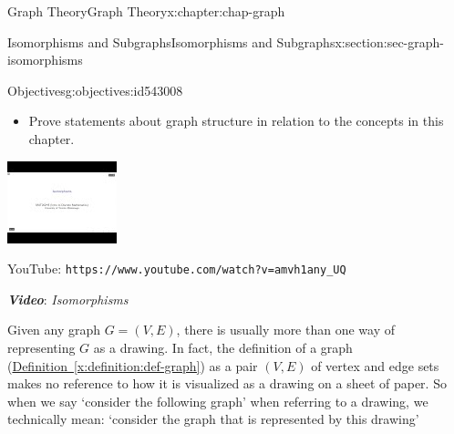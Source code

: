 \documentclass[oneside,10pt,]{book}
\newcommand{\xreffont}{\relax}
\newcommand{\mono}[1]{\texttt{#1}}
\newcommand{\alert}[1]{\textbf{\textit{#1}}}
\numberwithin{equation}{section}
\newlength{\qrsize}
\newlength{\previewwidth}
\begin{document}
\begin{chapterptx}{Graph Theory}{}{Graph Theory}{}{}{x:chapter:chap-graph}
\begin{sectionptx}{Isomorphisms and Subgraphs}{}{Isomorphisms and Subgraphs}{}{}{x:section:sec-graph-isomorphisms}
\begin{objectives}{Objectives}{g:objectives:id543008}
\begin{itemize}[label=\textbullet]
\item{}Prove statements about graph structure in relation to the concepts in this chapter.%
\end{itemize}
\end{objectives}
\begin{sidebyside}{1}{0}{0}{0}%
\begin{sbspanel}{1}%
\setlength{\qrsize}{9em}
\setlength{\previewwidth}{\linewidth}
\addtolength{\previewwidth}{-\qrsize}
\begin{tcbraster}[raster columns=2, raster column skip=1pt, raster halign=center, raster force size=false, raster left skip=0pt, raster right skip=0pt]%
\begin{tcolorbox}[previewstyle, width=\previewwidth]%
\includegraphics[width=0.80\linewidth,height=\qrsize,keepaspectratio]{images/video-isomoprhism.jpg}%
\end{tcolorbox}%
\begin{tcolorbox}[qrstyle]%
{\hypersetup{urlcolor=black}}%
\end{tcolorbox}%
\begin{tcolorbox}[captionstyle]%
\small YouTube: \mono{https://www.youtube.com/watch?v=amvh1any\_UQ}\end{tcolorbox}%
\end{tcbraster}%
\end{sbspanel}%
\end{sidebyside}%
\par
\alert{Video}: \emph{Isomorphisms}%
\par
Given any graph \(G = (V,E)\), there is usually more than one way of representing \(G\) as a drawing. In fact, the definition of a graph (\hyperref[x:definition:def-graph]{Definition~{\xreffont\ref{x:definition:def-graph}}}) as a pair \((V,E)\) of vertex and edge sets makes no reference to how it is visualized as a drawing on a sheet of paper. So when we say `consider the following graph' when referring to a drawing, we technically mean: `consider the graph that is represented by this drawing\textellipsis{}'%

\end{sectionptx}
\end{chapterptx}
\end{document}
